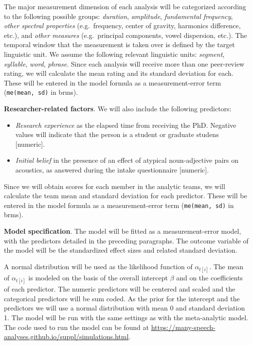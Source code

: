 \documentclass[Review,times,sageh]{sagej}
\providecommand{\tightlist}{\setlength{\itemsep}{0pt}\setlength{\parskip}{0pt}}
\begin{document}
The major measurement dimension of each analysis will be categorized according to the following possible groups: \emph{duration}, \emph{amplitude}, \emph{fundamental frequency}, \emph{other spectral properties} (e.g.~frequency, center of gravity, harmonics difference, etc.), and \emph{other measures} (e.g.~principal components, vowel dispersion, etc.).
The temporal window that the measurement is taken over is defined by the target linguistic unit.
We assume the following relevant linguistic units: \emph{segment}, \emph{syllable}, \emph{word}, \emph{phrase}.
Since each analysis will receive more than one peer-review rating, we will calculate the mean rating and its standard deviation for each.
These will be entered in the model formula as a measurement-error term (\texttt{me(mean,\ sd)} in brms).

\textbf{Researcher-related factors}. We will also include the following predictors:

\begin{itemize}
\tightlist
\item
  \emph{Research experience} as the elapsed time from receiving the PhD. Negative values will indicate that the person is a student or graduate studens {[}numeric{]}.
\item
  \emph{Initial belief} in the presence of an effect of atypical noun-adjective pairs on acoustics, as answered during the intake questionnaire {[}numeric{]}.
\end{itemize}

Since we will obtain scores for each member in the analytic teams, we will calculate the team mean and standard deviation for each predictor.
These will be entered in the model formula as a measurement-error term (\texttt{me(mean,\ sd)} in brms).

\textbf{Model specification}. The model will be fitted as a measurement-error model, with the predictors detailed in the preceding paragraphs.
The outcome variable of the model will be the standardized effect sizes and related standard deviation.

A normal distribution will be used as the likelihood function of \(\alpha_{t[i]}\).
The mean of \(\alpha_{t[i]}\) is modeled on the basis of the overall intercept \(\beta\) and on the coefficients of each predictor.
The numeric predictors will be centered and scaled and the categorical predictors will be sum coded.
As the prior for the intercept and the predictors we will use a normal distribution with mean 0 and standard deviation 1.
The model will be run with the same settings as with the meta-analytic model.
The code used to run the model can be found at \url{https://many-speech-analyses.github.io/suppl/simulations.html}.
\end{document}
